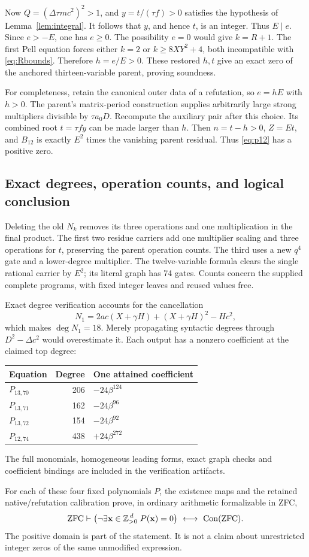 Now $Q=(\Delta\tau mc^2)^2>1$, and
$y=t/(\tau f)>0$ satisfies the hypothesis of
Lemma~\ref{lem:integral}. It follows that $y$, and hence $t$, is an
integer. Thus $E\mid e$. Since $e>-E$, one has $e\ge0$.
The possibility $e=0$ would give $k=R+1$. The first Pell equation
forces either $k=2$ or $k\ge8XY^2+4$, both incompatible with
\eqref{eq:Rbounds}. Therefore $h=e/E>0$. These restored $h,t$ give
an exact zero of the anchored thirteen-variable parent, proving soundness.

For completeness, retain the canonical outer data of a refutation,
so $e=hE$ with $h>0$. The parent's matrix-period construction supplies
arbitrarily large strong multipliers divisible by $\tau a_0D$.
Recompute the auxiliary pair after this choice. Its combined root
$t=\tau f y$ can be made larger than $h$. Then $n=t-h>0$, $Z=Et$,
and $B_{12}$ is exactly $E^2$ times the vanishing parent residual.
Thus \eqref{eq:p12} has a positive zero.

\subsection{Exact degrees, operation counts, and logical conclusion}

Deleting the old $N_k$ removes its three operations and one multiplication
in the final product. The first two residue carriers add one multiplier
scaling and three operations for $t$, preserving the parent operation
counts. The third uses a new $q^4$ gate and a lower-degree multiplier.
The twelve-variable formula clears the single rational carrier by $E^2$;
its literal graph has 74 gates. Counts concern the supplied complete
programs, with fixed integer leaves and reused values free.

Exact degree verification accounts for the cancellation
\[
 N_1=2ac(X+\gamma H)+(X+\gamma H)^2-Hc^2,
\]
which makes $\deg N_1=18$. Merely propagating syntactic degrees
through $D^2-\Delta c^2$ would overestimate it. Each output has a
nonzero coefficient at the claimed top degree:
\begin{center}\small
\begin{tabular}{@{}lrl@{}}
\toprule
Equation & Degree & One attained coefficient\\
\midrule
$P_{13,70}$ &206&$-24\beta^{124}$\\
$P_{13,71}$ &162&$-24\beta^{96}$\\
$P_{13,72}$ &154&$-24\beta^{92}$\\
$P_{12,74}$ &438&$+24\beta^{272}$\\
\bottomrule
\end{tabular}
\end{center}
The full monomials, homogeneous leading forms, exact graph checks and
coefficient bindings are included in the verification artifacts.

For each of these four fixed polynomials $P$, the existence maps and
the retained native/refutation calibration prove, in ordinary arithmetic
formalizable in ZFC,
\[
 \mathrm{ZFC}\vdash
 \bigl(\neg\exists\mathbf x\in\mathbb Z_{>0}^{\,d}\;P(\mathbf x)=0\bigr)
 \ \longleftrightarrow\ \operatorname{Con}(\mathrm{ZFC}).
\]
The positive domain is part of the statement. It is not a claim about
unrestricted integer zeros of the same unmodified expression.
